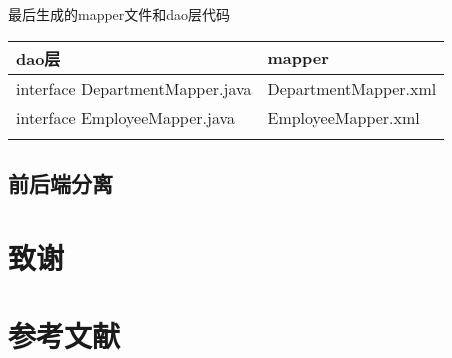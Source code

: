 \documentclass[
]{article}
\begin{document}
最后生成的mapper文件和dao层代码

\begin{longtable}[]{@{}ll@{}}
\toprule
dao层 & mapper \\
\midrule
\endhead
interface DepartmentMapper.java & DepartmentMapper.xml \\
interface EmployeeMapper.java & EmployeeMapper.xml \\
& \\
\bottomrule
\end{longtable}

\hypertarget{ux524dux540eux7aefux5206ux79bb}{%
\subsection{前后端分离}\label{ux524dux540eux7aefux5206ux79bb}}

\hypertarget{ux81f4ux8c22}{%
\section{致谢}\label{ux81f4ux8c22}}

\hypertarget{ux53c2ux8003ux6587ux732e}{%
\section{参考文献}\label{ux53c2ux8003ux6587ux732e}}
\end{document}
